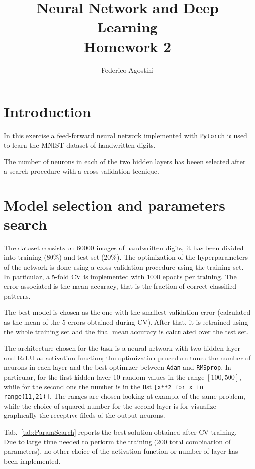 \documentclass[a4paper,11pt]{article}
\title{Neural Network and Deep Learning \\ Homework 2}
\author{Federico Agostini}
\date{}
\begin{document}
\maketitle

\section{Introduction}
In this exercise a feed-forward neural network implemented with \texttt{Pytorch} is used to learn the MNIST dataset of handwritten digits.

The number of neurons in each of the two hidden layers has beeen selected after a search procedure with a cross validation tecnique.

\section{Model selection and parameters search}
The dataset consists on 60000 images of handwritten digits; it has been divided into training (80\%) and test set (20\%). The optimization of the hyperparameters of the network is done using a cross validation procedure using the training set. In particular, a 5-fold CV is implemented with 1000 epochs per training. The error associated is the mean accuracy, that is the fraction of correct classified patterns.

The best model is chosen as the one with the smallest validation error (calculated as the mean of the 5 errors obtained during CV). After that, it is retrained using the whole training set and the final mean accuracy is calculated over the test set.

The architecture chosen for the task is a neural network with two hidden layer and ReLU as activation function; the optimization procedure tunes the number of neurons in each layer and the best optimizer between \texttt{Adam} and \texttt{RMSprop}. In particular, for the first hidden layer 10 random values in the range $[100, 500]$, while for the second one the number is in the list \texttt{[x**2 for x in range(11,21)]}. The ranges are chosen looking at example of the same problem, while the choice of squared number for the second layer is for visualize graphically the receptive fileds of the output neurons.

Tab.~\ref{tab:ParamSearch} reports the best solution obtained after CV training. Due to large time needed to perform the training (200 total combination of parameters), no other choice of the activation function or number of layer has been implemented.
\end{document}
